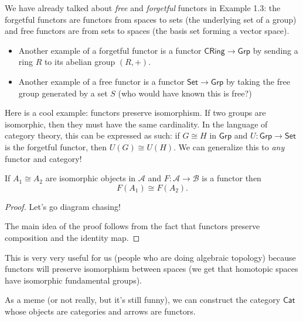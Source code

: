 \begin{example}
    We have already talked about \emph{free} and \emph{forgetful} functors in Example 1.3: the forgetful functors are functors from spaces to sets (the underlying set of a group) and free functors are from sets to spaces (the basis set forming a vector space).
    \begin{itemize}
        \item Another example of a forgetful functor is a functor $\mathsf{CRing}\to \mathsf{Grp}$ by sending a ring $R$ to its abelian group $(R,+)$.
        \item Another example of a free functor is a functor $\mathsf{Set}\to \mathsf{Grp}$ by taking the free group generated by a set $S$ (who would have known this is free?)
    \end{itemize}
\end{example}
Here is a cool example: functors preserve isomorphism. If two groups are isomorphic, then they must have the same cardinality. In the language of category theory, this can be expressed as such: if $G\cong H$ in $\mathsf{Grp}$ and $U \colon \mathsf{Grp} \to \mathsf{Set}$ is the forgetful functor, then $U(G)\cong U(H)$. We can generalize this to \emph{any} functor and category!
\begin{theorem}
    If $A_1\cong A_2$ are isomorphic objects in $\mathcal{A}$ and $F \colon \mathcal{A} \to \mathcal{B}$ is a functor then \[
        F(A_1)\cong F(A_2).
    \] 
\end{theorem}
\begin{proof}
Let's go diagram chasing!
            \begin{figure}[H]
                \centering
            \end{figure}
The main idea of the proof follows from the fact that functors preserve composition and the identity map. 
\end{proof}
This is very very useful for us (people who are doing algebraic topology) because functors will preserve isomorphism between spaces (we get that homotopic spaces have isomorphic fundamental groups).
\begin{note}
    As a meme (or not really, but it's still funny), we can construct the category $\mathsf{Cat}$ whose objects are categories and arrows are functors.
\end{note}
